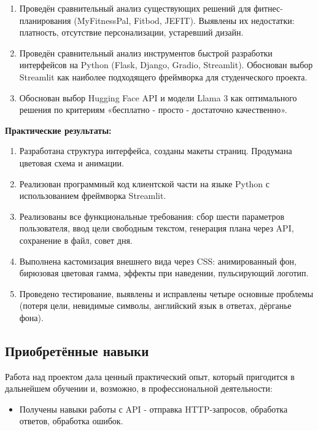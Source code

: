 \documentclass[14pt, a4paper]{extarticle}
\begin{document}
\begin{enumerate}
\begin{enumerate}
\item Проведён сравнительный анализ существующих решений для фитнес-планирования (MyFitnessPal, Fitbod, JEFIT). Выявлены их недостатки: платность, отсутствие персонализации, устаревший дизайн.

\item Проведён сравнительный анализ инструментов быстрой разработки интерфейсов на Python (Flask, Django, Gradio, Streamlit). Обоснован выбор Streamlit как наиболее подходящего фреймворка для студенческого проекта.

\item Обоснован выбор Hugging Face API и модели Llama 3 как оптимального решения по критериям «бесплатно - просто - достаточно качественно».

\end{enumerate}

\noindent \textbf{Практические результаты:}
\begin{enumerate}
\item Разработана структура интерфейса, созданы макеты страниц. Продумана цветовая схема и анимации.

\item Реализован программный код клиентской части на языке Python с использованием фреймворка Streamlit.

\item Реализованы все функциональные требования: сбор шести параметров пользователя, ввод цели свободным текстом, генерация плана через API, сохранение в файл, совет дня.

\item Выполнена кастомизация внешнего вида через CSS: анимированный фон, бирюзовая цветовая гамма, эффекты при наведении, пульсирующий логотип.

\item Проведено тестирование, выявлены и исправлены четыре основные проблемы (потеря цели, невидимые символы, английский язык в ответах, дёрганье фона).
\end{enumerate}

\subsection*{Приобретённые навыки}

\noindent Работа над проектом дала ценный практический опыт, который пригодится в дальнейшем обучении и, возможно, в профессиональной деятельности:

\begin{itemize}
\item Получены навыки работы с API - отправка HTTP-запросов, обработка ответов, обработка ошибок.


\end{itemize}
\end{enumerate}
\end{document}
